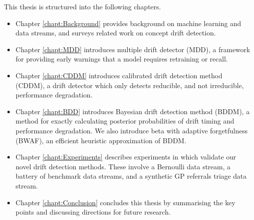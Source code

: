 This thesis is structured into the following chapters.
\begin{itemize}
    \item Chapter \ref{chapt:Background} provides background on machine learning and data streams, and surveys related work on concept drift detection.
    \item Chapter \ref{chapt:MDD} introduces multiple drift detector (MDD), a framework  for providing early warnings that a model requires retraining or recall.
    \item Chapter \ref{chapt:CDDM} introduces calibrated drift detection method (CDDM), a drift detector which only detects reducible, and not irreducible, performance degradation.
    \item Chapter \ref{chapt:BDD} introduces Bayesian drift detection method (BDDM), a method for exactly calculating posterior probabilities of drift timing and performance degradation. We also introduce beta with adaptive forgetfulness (BWAF), an efficient heuristic approximation of BDDM.
    \item Chapter \ref{chapt:Experiments} describes experiments in which validate our novel drift detection methods. These involve a Bernoulli data stream, a battery of benchmark data streams, and a synthetic GP referrals triage data stream.
    \item Chapter \ref{chapt:Conclusion} concludes this thesis by summarising the key points and discussing directions for future research.
\end{itemize}
